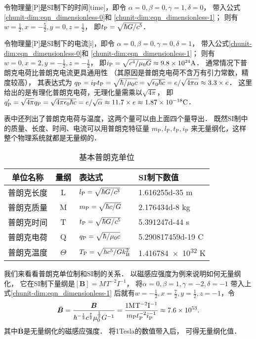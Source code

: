 令物理量[\si{P}]是SI制下的时间[\si{time}]，即令
$\alpha=0,\beta=0,\gamma=1,\delta=0$，
带入公式\eqref{chunit-dim:eqn_dimensionless-0}和
\eqref{chunit-dim:eqn_dimensionless-1}；
则有$w=\frac{1}{2},x=-\frac{5}{2},y=0,z=\frac{1}{2}$，
即$t_{\rm P}=\sqrt{\hbar G/c^5}$．

令物理量[\si{P}]是SI制下的电流[\si{i}]，即令
$\alpha=0,\beta=0,\gamma=0,\delta=1$，
带入公式\eqref{chunit-dim:eqn_dimensionless-0}和
\eqref{chunit-dim:eqn_dimensionless-1}；
则有$w=0,x=2,y=-\frac{1}{2},z=-\frac{1}{2}$，
即$i_{\rm P}=\sqrt{c^4/\mu_0 G}\approx \num{9.8e24}  \si{A}$．
通常情况下普朗克电荷比普朗克电流更具通用性
（其原因是普朗克电荷不含万有引力常数，精度较高），
其表达式为
$q_{\rm P}=i_{\rm P} t_{\rm P}=\sqrt{\hbar/\mu_0 c}
=\sqrt{\epsilon_0\hbar c}=e/\sqrt{4\pi \alpha} \approx \num{3.3}\times e$．
这里给出的是有理化普朗克电荷，无理化量需乘以$\sqrt{4\pi}$，
即 $q'_{\rm P}=\sqrt{4\pi}q_{\rm P}=\sqrt{4\pi\epsilon_0\hbar c}
=e/\sqrt{\alpha}\approx\num{11.7}\times e \approx\num{1.87d-18}\si{C}$．


表中还列出了普朗克电荷与温度，这两个量可以由上面四个量导出．
既然SI制中的质量、长度、时间、电流可以用普朗克特征量
$m_{\mathrm{P}},l_{\mathrm{P}},t_{\mathrm{P}},i_{\mathrm{P}}$
来无量纲化，这样整个物理系统就都是无量纲的．

\begin{table}[htb]
    \centering
    \caption{基本普朗克单位} \label{tab:planck-const}
    \begin{tabular}{ccll}
        \toprule
        单位名称 & 量纲 & 表达式 & SI制下数值 \\
        \midrule
        普朗克长度 & \si{L}   & $l_{\rm P}=\sqrt{\hbar G/c^3}$     & \num{1.616255d-35} \si{m}  \\
        普朗克质量 & \si{M}   & $m_{\rm P}=\sqrt{\hbar c/G}$       & \num{2.176434d-8}  \si{kg} \\
        普朗克时间 & \si{T}   & $t_{\rm P}=\sqrt{\hbar G/c^5}$     & \num{5.391247d-44} \si{s} \\
        普朗克电荷 & \si{Q}   & $q_{\rm P}=\sqrt{\hbar/\mu_0 c}$   & \num{5.290817459d-19} \si{C} \\
        普朗克温度 & $\Theta$ & $T_{\rm P}=\sqrt{\hbar c^5/G k^2_{\rm B}}$ & \num{1.416784e32}  \si{K}  \\
        \bottomrule
    \end{tabular}
\end{table}



我们来看看普朗克单位制和SI制的关系．
以磁感应强度为例来说明如何无量纲化，
它在SI制下量纲是$[\boldsymbol{B}]=\si{M^{}T^{-2}I^{-1}} $，
将$\alpha=0,\beta=1,\gamma=-2,\delta=-1$
带入上式\eqref{chunit-dim:eqn_dimensionless-1}
后就有$w=-\frac{1}{2},x=\frac{7}{2},y=\frac{1}{2} ,z=-1$，令
\begin{equation*}
\bar{\boldsymbol{B}} = \dfrac{\boldsymbol{B}}{\hbar^{-\frac{1}{2}}c^{\frac{7}{2}}\mu_0^{\frac{1}{2}}G^{-1}}
= \dfrac{\num{1}\si{M^{}T^{-2}I^{-1}}}{m_{\rm P} t_{\rm P}^{-2} i_{\rm P}^{-1}}
\approx \num{7.6e53}  .
\end{equation*}
其中$\bar{\boldsymbol{B}}$是无量纲化的磁感应强度．
将\num{1}\si{Tesla}的数值带入后，
可得无量纲化值．



